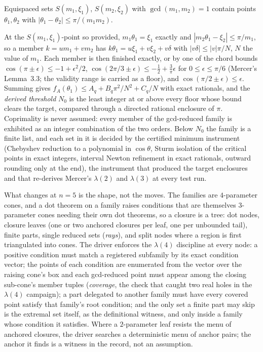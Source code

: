 \documentclass[11pt]{article}
\begin{document}
\begin{lemma}\label{lem:C}
Equispaced sets $S(m_1,\xi_1)$, $S(m_2,\xi_2)$ with $\gcd(m_1,m_2)=1$ contain points $\theta_1,\theta_2$ with $|\theta_1-\theta_2|\le\pi/(m_1m_2)$.
\end{lemma}

At the $S(m_1,\xi_1)$-point so provided, $m_1\theta_1=\xi_1$ exactly and $|m_2\theta_1-\xi_2|\le\pi/m_1$, so a member $k=um_1+vm_2$ has $k\theta_1=u\xi_1+v\xi_2+v\delta$ with $|v\delta|\le|v|\pi/N$, $N$ the value of $m_1$. Each member is then finished exactly, or by one of the chord bounds $\cos(\pi\pm\epsilon)\le-1+\epsilon^2/2$, $\cos(2\pi/3\pm\epsilon)\le-\frac12+\frac3\pi\epsilon$ for $0\le\epsilon\le\pi/6$ (Mercer's Lemma~3.3; the validity range is carried as a floor), and $\cos(\pi/2\pm\epsilon)\le\epsilon$. Summing gives $f_A(\theta_1)\le A_q+B_q\pi^2/N^2+C_q/N$ with exact rationals, and the \emph{derived threshold} $N_0$ is the least integer at or above every floor whose bound clears the target, compared through a directed rational enclosure of $\pi$. Coprimality is never assumed: every member of the gcd-reduced family is exhibited as an integer combination of the two orders. Below $N_0$ the family is a finite list, and each set in it is decided by the certified minimum instrument (Chebyshev reduction to a polynomial in $\cos\theta$, Sturm isolation of the critical points in exact integers, interval Newton refinement in exact rationals, outward rounding only at the end), the instrument that produced the target enclosures and that re-derives Mercer's $\lambda(2)$ and $\lambda(3)$ at every test run.

What changes at $n=5$ is the shape, not the moves. The families are $4$-parameter cones, and a dot theorem on a family raises conditions that are themselves $3$-parameter cones needing their own dot theorems, so a closure is a tree: dot nodes, closure leaves (one or two anchored closures per leaf, one per unbounded tail), finite parts, single reduced sets (\emph{rays}), and split nodes where a region is first triangulated into cones. The driver enforces the $\lambda(4)$ discipline at every node: a positive condition must match a registered subfamily by its exact condition vector; the points of each condition are enumerated from the vector over the raising cone's box and each gcd-reduced point must appear among the closing sub-cone's member tuples (\emph{coverage}, the check that caught two real holes in the $\lambda(4)$ campaign); a part delegated to another family must have every covered point satisfy that family's root condition; and the only set a finite part may skip is the extremal set itself, as the definitional witness, and only inside a family whose condition it satisfies. Where a $2$-parameter leaf resists the menu of anchored closures, the driver searches a deterministic menu of anchor pairs; the anchor it finds is a witness in the record, not an assumption.
\end{document}
